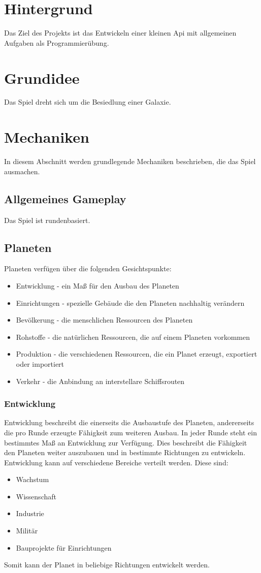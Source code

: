 \documentclass[11pt, a4paper]{article}
\begin{document}
\section{Hintergrund}
Das Ziel des Projekts ist das Entwickeln einer kleinen Api mit allgemeinen Aufgaben als Programmierübung.
%
\section{Grundidee}
Das Spiel dreht sich um die Besiedlung einer Galaxie.
%
\section{Mechaniken}
In diesem Abschnitt werden grundlegende Mechaniken beschrieben, die das Spiel ausmachen.
%
\subsection{Allgemeines Gameplay}
Das Spiel ist rundenbasiert.
%
\subsection{Planeten}
Planeten verfügen über die folgenden Gesichtspunkte:
\begin{itemize}
	\item Entwicklung - ein Maß für den Ausbau des Planeten
	\item Einrichtungen - spezielle Gebäude die den Planeten nachhaltig verändern
	\item Bevölkerung - die menschlichen Ressourcen des Planeten
	\item Rohstoffe - die natürlichen Ressourcen, die auf einem Planeten vorkommen
	\item Produktion - die verschiedenen Ressourcen, die ein Planet erzeugt, exportiert oder importiert
	\item Verkehr - die Anbindung an interstellare Schiffsrouten
\end{itemize}
%
\subsubsection{Entwicklung}
Entwicklung beschreibt die einerseits die Ausbaustufe des Planeten, andererseits die pro Runde erzeugte
Fähigkeit zum weiteren Ausbau. In jeder Runde steht ein bestimmtes Maß an Entwicklung zur Verfügung.
Dies beschreibt die Fähigkeit den Planeten weiter auszubauen und in bestimmte Richtungen zu entwickeln.
Entwicklung kann auf verschiedene Bereiche verteilt werden. Diese sind:
\begin{itemize}
	\item Wachstum
	\item Wissenschaft
	\item Industrie
	\item Militär
	\item Bauprojekte für Einrichtungen
\end{itemize}
%
Somit kann der Planet in beliebige Richtungen entwickelt werden.
%
\end{document}
